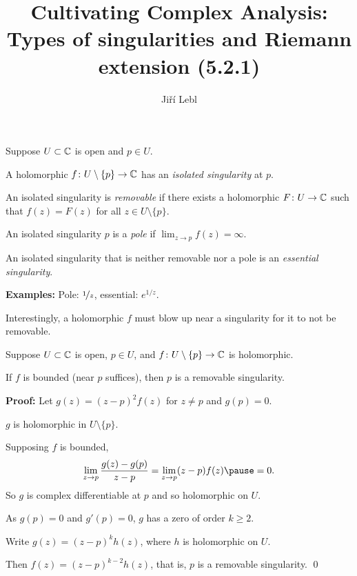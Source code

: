 \documentclass[10pt,aspectratio=169]{beamer}
\author{Ji\v{r}\'i Lebl}
\institute[OSU]{%
Departemento pri Matematiko de Oklahoma {\^S}tata Universitato}
\title{Cultivating Complex Analysis:\\%
Types of singularities and Riemann extension (5.2.1)}
\date{}
\begin{document}
\begin{frame}
\titlepage
\end{frame}

\begin{frame}
\begin{definition}
Suppose $U \subset {\mathbb{C}}$ is open and $p \in U$.

\medskip
\pause
A holomorphic $f \colon U \setminus \{ p \} \to {\mathbb{C}}$ has
an \emph{isolated singularity} at $p$.

\medskip
\pause
An isolated singularity is \emph{removable}
if there exists a holomorphic $F \colon U \to {\mathbb{C}}$
such that $f(z) = F(z)$ for all $z \in U \setminus \{ p \}$.

\medskip
\pause
An isolated singularity $p$ is a \emph{pole} if 
$\displaystyle
\lim_{z \to p} f(z) = \infty$.

\medskip
\pause
An isolated singularity that is neither removable nor a pole is 
an \emph{essential singularity}.
\end{definition}

\pause

\textbf{Examples:} Pole: $\nicefrac{1}{z}$, essential: $e^{1/z}$.

\medskip
\pause

Interestingly, a holomorphic $f$ must blow up near a singularity for it to
not be removable.

\end{frame}

\begin{frame}

\begin{theorem}
Suppose $U \subset {\mathbb{C}}$ is open, $p \in U$,
and $f \colon U \setminus \{p\} \to {\mathbb{C}}$ is holomorphic.

\pause
If $f$ is bounded (near $p$ suffices), then $p$ is a removable singularity.
\end{theorem}

\pause

\textbf{Proof:}
Let $g(z) = {(z-p)}^2 f(z)$ for $z \not= p$ and $g(p) = 0$.

\medskip
\pause

$g$ is holomorphic in $U \setminus \{ p \}$.

\medskip
\pause

Supposing $f$ is bounded,
\[
\lim_{z\to p} \frac{g(z)-g(p)}{z-p} = \lim_{z\to p} (z-p) f(z) \pause = 0 .
\]
\pause
So $g$ is complex differentiable at $p$ and so holomorphic on $U$.

\medskip
\pause

As $g(p)=0$ and $g'(p)=0$, $g$ has a zero of order $k \geq 2$.

\medskip
\pause

Write $g(z) = {(z-p)}^k h(z)$, where $h$ is holomorphic on $U$.

\medskip
\pause

Then $f(z) = {(z-p)}^{k-2}h(z)$, that is, $p$ is a removable singularity.
\qed

\end{frame}
\end{document}
